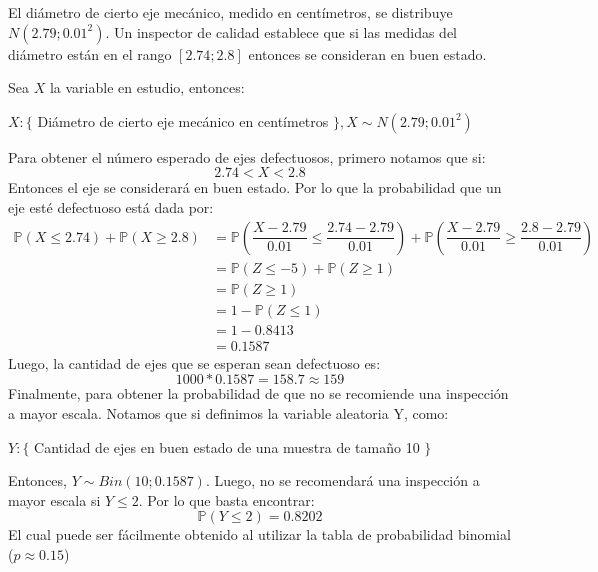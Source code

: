 
\addpoints
\question[25] El diámetro de cierto eje mecánico, medido en centímetros, se distribuye $N(2.79;0.01^2)$. Un inspector de calidad establece que si las medidas del diámetro están en el rango $[2.74;2.8]$ entonces se consideran en buen estado.
\noaddpoints
{}

\begin{solution}
Sea $X$ la variable en estudio, entonces:
\begin{center}
$X:\{$ Diámetro de cierto eje mecánico en centímetros $\}, X\sim N(2.79;0.01^2)$
\end{center}
Para obtener el número esperado de ejes defectuosos, primero notamos que si:
$$2.74 < X < 2.8$$
Entonces el eje se considerará en buen estado. Por lo que la probabilidad que un eje esté defectuoso está dada por:
\begin{align*}
\mathbb{P}(X\leq 2.74) + \mathbb{P}(X\geq 2.8)&= \mathbb{P}\left( \dfrac{X-2.79}{0.01}\leq \dfrac{2.74-2.79}{0.01}\right)+ \mathbb{P} \left( \dfrac{X-2.79}{0.01}\geq \dfrac{2.8-2.79}{0.01}\right)\\
&=\mathbb{P}(Z \leq -5)+\mathbb{P}(Z\geq 1)\\
&=\mathbb{P}(Z\geq 1)\\
&= 1- \mathbb{P}(Z\leq 1)\\
&= 1- 0.8413\\
&= 0.1587
\end{align*}
Luego, la cantidad de ejes que se esperan sean defectuoso es:
$$1000*0.1587=158.7 \approx 159$$
Finalmente, para obtener la probabilidad de que no se recomiende una inspección a mayor escala. Notamos que si definimos la variable aleatoria Y, como:
\begin{center}
$Y:\{$ Cantidad de ejes en buen estado de una muestra de tamaño 10 $\}$
\end{center}
Entonces, $Y\sim Bin(10;0.1587)$. Luego, no se recomendará una inspección a mayor escala si $Y \leq 2$. Por lo que basta encontrar:
$$\mathbb{P}(Y\leq 2)= 0.8202$$
El cual puede ser fácilmente obtenido al utilizar la tabla de probabilidad binomial ($p\approx 0.15$)

\end{solution}